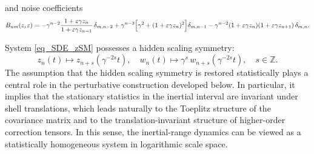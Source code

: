 \documentclass[aps,twocolumn,superscriptaddress]{revtex4-2}
\begin{document}
and noise coefficients
\begin{equation}
\begin{aligned}
B_{nm}(z,\varepsilon)
=
-\gamma^{n-2}\frac{1+\varepsilon\gamma z_n}{1+\varepsilon\gamma z_{n-1}}\,\delta_{m,n-2}
+\gamma^{n-3}\Bigl[\gamma^2+(1+\varepsilon\gamma z_n)^2\Bigr]\delta_{m,n-1}
-\gamma^{n-2}(1+\varepsilon\gamma z_n)(1+\varepsilon\gamma z_{n+1})\,\delta_{m,n}.
\end{aligned}
\label{eq:diffusion_Bnm}
\end{equation}

System \eqref{eq_SDE_zSM} possesses a hidden scaling symmetry:
\begin{equation}
z_n(t) \mapsto z_{n+s}(\gamma^{-2s}t),
\quad
w_n(t) \mapsto \gamma^s\,w_{n+s}(\gamma^{-2s}t),
\quad
s \in \mathbb{Z}.



\label{eq_HSSM}
\end{equation}
The assumption that the hidden scaling symmetry is restored statistically plays a central role in the perturbative construction developed below. In particular, it implies that the stationary statistics in the inertial interval are invariant under shell translations, which leads naturally to the Toeplitz structure of the covariance matrix and to the translation-invariant structure of higher-order correction tensors. In this sense, the inertial-range dynamics can be viewed as a statistically homogeneous system in logarithmic scale space.
\end{document}
